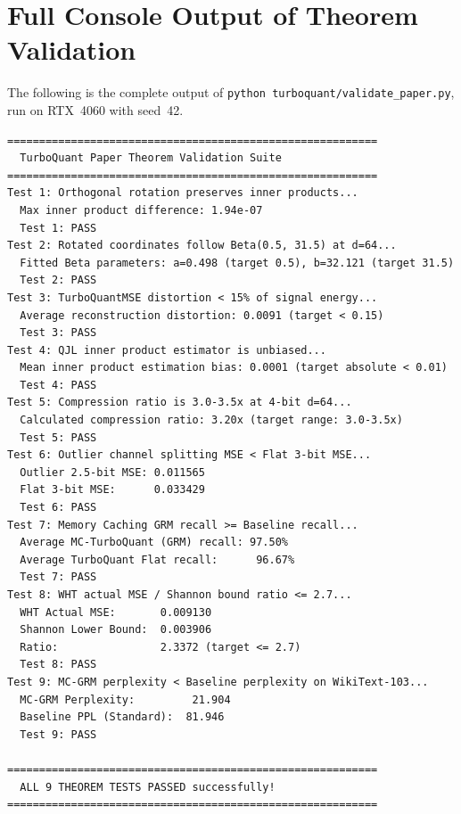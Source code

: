 
\section{Full Console Output of Theorem Validation}
\label{app:console}

The following is the complete output of
\texttt{python turboquant/validate\_paper.py},
run on RTX~4060 with seed~42.

\begin{small}
\begin{verbatim}
==========================================================
  TurboQuant Paper Theorem Validation Suite
==========================================================
Test 1: Orthogonal rotation preserves inner products...
  Max inner product difference: 1.94e-07
  Test 1: PASS
Test 2: Rotated coordinates follow Beta(0.5, 31.5) at d=64...
  Fitted Beta parameters: a=0.498 (target 0.5), b=32.121 (target 31.5)
  Test 2: PASS
Test 3: TurboQuantMSE distortion < 15% of signal energy...
  Average reconstruction distortion: 0.0091 (target < 0.15)
  Test 3: PASS
Test 4: QJL inner product estimator is unbiased...
  Mean inner product estimation bias: 0.0001 (target absolute < 0.01)
  Test 4: PASS
Test 5: Compression ratio is 3.0-3.5x at 4-bit d=64...
  Calculated compression ratio: 3.20x (target range: 3.0-3.5x)
  Test 5: PASS
Test 6: Outlier channel splitting MSE < Flat 3-bit MSE...
  Outlier 2.5-bit MSE: 0.011565
  Flat 3-bit MSE:      0.033429
  Test 6: PASS
Test 7: Memory Caching GRM recall >= Baseline recall...
  Average MC-TurboQuant (GRM) recall: 97.50%
  Average TurboQuant Flat recall:      96.67%
  Test 7: PASS
Test 8: WHT actual MSE / Shannon bound ratio <= 2.7...
  WHT Actual MSE:       0.009130
  Shannon Lower Bound:  0.003906
  Ratio:                2.3372 (target <= 2.7)
  Test 8: PASS
Test 9: MC-GRM perplexity < Baseline perplexity on WikiText-103...
  MC-GRM Perplexity:         21.904
  Baseline PPL (Standard):  81.946
  Test 9: PASS

==========================================================
  ALL 9 THEOREM TESTS PASSED successfully!
==========================================================
\end{verbatim}
\end{small}

